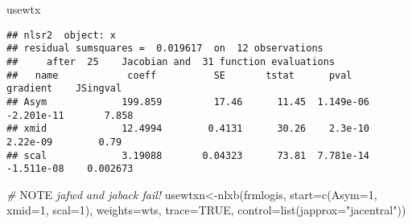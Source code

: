 \documentclass[
]{article}
\newenvironment{Shaded}{\begin{snugshade}}{\end{snugshade}}
\newcommand{\AlertTok}[1]{\textcolor[rgb]{0.94,0.16,0.16}{#1}}
\newcommand{\AttributeTok}[1]{\textcolor[rgb]{0.77,0.63,0.00}{#1}}
\newcommand{\CommentTok}[1]{\textcolor[rgb]{0.56,0.35,0.01}{\textit{#1}}}
\newcommand{\ConstantTok}[1]{\textcolor[rgb]{0.00,0.00,0.00}{#1}}
\newcommand{\DecValTok}[1]{\textcolor[rgb]{0.00,0.00,0.81}{#1}}
\newcommand{\FunctionTok}[1]{\textcolor[rgb]{0.00,0.00,0.00}{#1}}
\newcommand{\NormalTok}[1]{#1}
\newcommand{\OtherTok}[1]{\textcolor[rgb]{0.56,0.35,0.01}{#1}}
\newcommand{\StringTok}[1]{\textcolor[rgb]{0.31,0.60,0.02}{#1}}
\begin{document}
\begin{Shaded}
\begin{Highlighting}[]
\NormalTok{usewtx}
\end{Highlighting}
\end{Shaded}

\begin{verbatim}
## nlsr2  object: x 
## residual sumsquares =  0.019617  on  12 observations
##     after  25    Jacobian and  31 function evaluations
##   name            coeff          SE       tstat      pval      gradient    JSingval   
## Asym             199.859         17.46      11.45  1.149e-06  -2.201e-11       7.858  
## xmid             12.4994        0.4131      30.26    2.3e-10    2.22e-09        0.79  
## scal             3.19088       0.04323      73.81  7.781e-14  -1.511e-08    0.002673
\end{verbatim}

\begin{Shaded}
\begin{Highlighting}[]
\CommentTok{\# }\AlertTok{NOTE}\CommentTok{ jafwd and jaback fail!}
\NormalTok{usewtxn}\OtherTok{\textless{}{-}}\FunctionTok{nlxb}\NormalTok{(frmlogis,  }\AttributeTok{start=}\FunctionTok{c}\NormalTok{(}\AttributeTok{Asym=}\DecValTok{1}\NormalTok{, }\AttributeTok{xmid=}\DecValTok{1}\NormalTok{, }\AttributeTok{scal=}\DecValTok{1}\NormalTok{), }\AttributeTok{weights=}\NormalTok{wts, }\AttributeTok{trace=}\ConstantTok{TRUE}\NormalTok{, }\AttributeTok{control=}\FunctionTok{list}\NormalTok{(}\AttributeTok{japprox=}\StringTok{"jacentral"}\NormalTok{))}
\end{Highlighting}
\end{Shaded}
\end{document}
